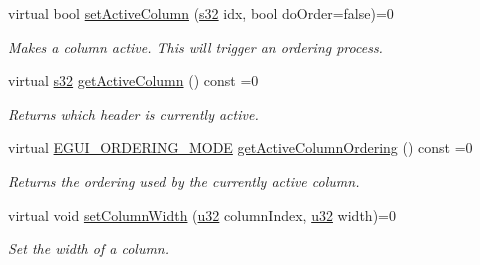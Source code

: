 \begin{DoxyCompactItemize}
virtual bool \hyperlink{classirr_1_1gui_1_1IGUITable_ae4882275e6695855c0f3ca55e20f554e}{set\+Active\+Column} (\hyperlink{namespaceirr_ac66849b7a6ed16e30ebede579f9b47c6}{s32} idx, bool do\+Order=false)=0
\begin{DoxyCompactList}\small\item\em Makes a column active. This will trigger an ordering process. \end{DoxyCompactList}\item 
\mbox{\label{classirr_1_1gui_1_1IGUITable_ac320d3049aef1cc12f5cc96b63c3f278}} 
virtual \hyperlink{namespaceirr_ac66849b7a6ed16e30ebede579f9b47c6}{s32} \hyperlink{classirr_1_1gui_1_1IGUITable_ac320d3049aef1cc12f5cc96b63c3f278}{get\+Active\+Column} () const =0
\begin{DoxyCompactList}\small\item\em Returns which header is currently active. \end{DoxyCompactList}\item 
\mbox{\label{classirr_1_1gui_1_1IGUITable_a0fbfc0ac0f9de7f11e847042e420c5a6}} 
virtual \hyperlink{namespaceirr_1_1gui_a577bf3aa30c2e3bde9aa3eaa2e4f16d3}{E\+G\+U\+I\+\_\+\+O\+R\+D\+E\+R\+I\+N\+G\+\_\+\+M\+O\+DE} \hyperlink{classirr_1_1gui_1_1IGUITable_a0fbfc0ac0f9de7f11e847042e420c5a6}{get\+Active\+Column\+Ordering} () const =0
\begin{DoxyCompactList}\small\item\em Returns the ordering used by the currently active column. \end{DoxyCompactList}\item 
\mbox{\label{classirr_1_1gui_1_1IGUITable_aa7e268c102808c74f781f3ce47070503}} 
virtual void \hyperlink{classirr_1_1gui_1_1IGUITable_aa7e268c102808c74f781f3ce47070503}{set\+Column\+Width} (\hyperlink{namespaceirr_a0416a53257075833e7002efd0a18e804}{u32} column\+Index, \hyperlink{namespaceirr_a0416a53257075833e7002efd0a18e804}{u32} width)=0
\begin{DoxyCompactList}\small\item\em Set the width of a column. \end{DoxyCompactList}\item 
\mbox{\label{classirr_1_1gui_1_1IGUITable_ab41cd5d05657cfb5e45762f290629645}} 

\end{DoxyCompactItemize}
